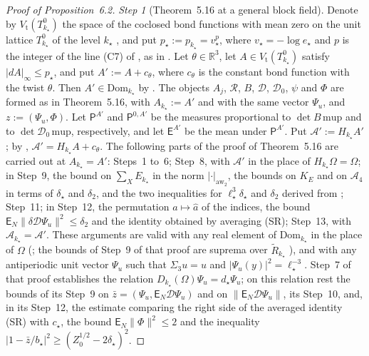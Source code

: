 \documentclass[11pt,letterpaper,reqno]{amsart}
\theoremstyle{definition}
\begin{document}
\begin{proof}[Proof of Proposition~6.2]
\emph{Step 1} (Theorem~5.16 at a general block field).
Denote by $V_{\mathrm t}(T^0_{k_\star})$ the space of the coclosed bond functions with mean zero on the unit lattice $T^0_{k_\star}$ of the level $k_\star$ \cite[Section~G4.0.6]{QEDIII}, and put $p_\star:=p_{k_\star}=v_\star^{p}$, where $v_\star=-\log e_\star$ and $p$ is the integer of the line (C7) of \cite[Section~I.8.2]{QEDIII}, as in \cite[Section~I.6.1]{QEDIII}.
Let $\theta\in\mathbb R^3$, let $A\in V_{\mathrm t}(T^0_{k_\star})$ satisfy $|dA|_\infty\le p_\star$, and put $A':=A+c_\theta$, where $c_\theta$ is the constant bond function with the twist $\theta$.
Then $A'\in\mathrm{Dom}_{k_\star}$ by \cite[Proposition~32.1]{QEDIII}.
The objects $A_j$, $\mathcal R$, $B$, $\mathcal D$, $\mathcal D_0$, $\psi$ and $\Phi$ are formed as in Theorem~5.16, with $A_{k_\star}:=A'$ and with the same vector $\Psi_u$, and $z:=(\Psi_u,\Phi)$.
Let $\mathsf P^{A'}$ and $\mathsf P^{0,A'}$ be the measures proportional to $\det B\,\mathrm{mup}$ and to $\det\mathcal D_0\,\mathrm{mup}$, respectively, and let $\mathsf E^{A'}$ be the mean under $\mathsf P^{A'}$.
Put $\mathscr A':=H_{k_\star}A'$;
by \cite[Proposition~5.31]{QEDI}, $\mathscr A'=H_{k_\star}A+c_\theta$.
The following parts of the proof of Theorem~5.16 are carried out at $A_{k_\star}=A'$:
Steps~1 to~6;
Step~8, with $\mathscr A'$ in the place of $H_{k_\star}\Omega=\Omega$;
in Step~9, the bound on $\sum_XE_{k_\star}$ in the norm $|\cdot|_{\mathrm{aw}_2}$, the bounds on $K_E$ and on $\mathcal A_4$ in terms of $\delta_\star$ and $\delta_2$, and the two inequalities for $\ell_\star^3\delta_\star$ and $\delta_2$ derived from \cite[(T2)]{QEDIII};
Step~11;
in Step~12, the permutation $a\mapsto\hat a$ of the indices, the bound $\mathsf E_N\|\delta\mathcal D\Psi_u\|^2\le\delta_2$ and the identity obtained by averaging (SR);
Step~13, with $\mathscr A_{k_\star}=\mathscr A'$.
These arguments are valid with any real element of $\mathrm{Dom}_{k_\star}$ in the place of $\Omega$ (\cite[Chapter~29, Lemma~2\,(t4)]{QEDIII}; the bounds of Step~9 of that proof are suprema over $\tilde R_{k_\star}$ \cite[Proposition~20.1\,(c)]{QEDIII}), and with any antiperiodic unit vector $\Psi_u$ such that $\Sigma_3u=u$ and $|\Psi_u(y)|^2=\ell_\star^{-3}$.
Step~7 of that proof establishes the relation $D_{k_\star}(\Omega)\Psi_u=d_\star\Psi_u$;
on this relation rest the bounds of its Step~9 on $\bar z=(\Psi_u,\mathsf E_N\mathcal D\Psi_u)$ and on $\|\mathsf E_N\mathcal D\Psi_u\|$, its Step~10, and, in its Step~12, the estimate comparing the right side of the averaged identity (SR) with $c_\star$, the bound $\mathsf E_N\|\Phi\|^2\le2$ and the inequality $|1-\bar z/b_\star|^2\ge(Z_0^{1/2}-2\delta_\star)^2$.

\end{proof}
\end{document}
